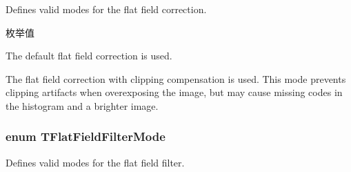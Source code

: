 Defines valid modes for the flat field correction. 

\begin{Desc}
\item[枚举值]\par
\begin{description}
\item[{\em 
\hypertarget{group___common_interface_ggadb6a737744f9f4b2d31a5921ca70f474a0da2f390884f75fe27cc66f4062422d1}{ffcm\+Default}\label{group___common_interface_ggadb6a737744f9f4b2d31a5921ca70f474a0da2f390884f75fe27cc66f4062422d1}
}]The default flat field correction is used. \item[{\em 
\hypertarget{group___common_interface_ggadb6a737744f9f4b2d31a5921ca70f474a18f959e6aa7566044fed1fc7470c3a3c}{ffcm\+Bright\+Preserving}\label{group___common_interface_ggadb6a737744f9f4b2d31a5921ca70f474a18f959e6aa7566044fed1fc7470c3a3c}
}]The flat field correction with clipping compensation is used. This mode prevents clipping artifacts when overexposing the image, but may cause missing codes in the histogram and a brighter image. \end{description}
\end{Desc}
\hypertarget{group___common_interface_ga40b7d79a1a58736a449305e4447060f8}{
\subsubsection[{T\+Flat\+Field\+Filter\+Mode}]{\setlength{\rightskip}{0pt plus 5cm}enum {\bf T\+Flat\+Field\+Filter\+Mode}}}\label{group___common_interface_ga40b7d79a1a58736a449305e4447060f8}


Defines valid modes for the flat field filter. 

